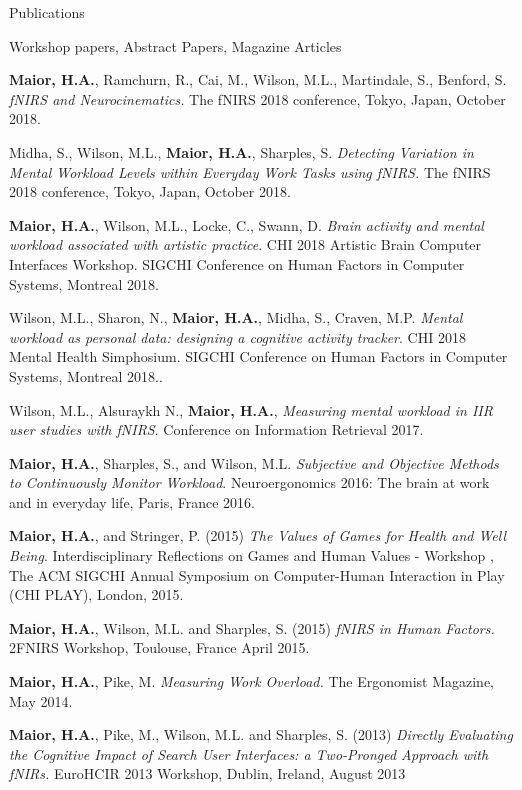 \documentclass{resume} %
\begin{document}
\begin{rSection}{Publications}
\begin{rSubsection}{ }{ }{ }{Workshop papers, Abstract Papers, Magazine Articles}
	\item \textbf{Maior, H.A.}, Ramchurn, R., Cai, M., Wilson, M.L., Martindale, S., Benford, S.  \emph{fNIRS and Neurocinematics.}  The fNIRS 2018 conference, Tokyo, Japan, October 2018.
	\item Midha, S., Wilson, M.L., \textbf{Maior, H.A.}, Sharples, S. \emph{Detecting Variation in Mental Workload Levels within Everyday Work Tasks using fNIRS.}  The fNIRS 2018 conference, Tokyo, Japan, October 2018.
	\item \textbf{Maior, H.A.}, Wilson, M.L., Locke, C., Swann, D.  \emph{Brain activity and mental workload associated with artistic practice}. CHI 2018 Artistic Brain Computer Interfaces Workshop. SIGCHI Conference on Human Factors in Computer Systems, Montreal 2018.
	\item Wilson, M.L., Sharon, N., \textbf{Maior, H.A.}, Midha, S., Craven, M.P.  \emph{Mental workload as personal data: designing a cognitive activity tracker}. CHI 2018 Mental Health Simphosium. SIGCHI Conference on Human Factors in Computer Systems, Montreal 2018..
	\item Wilson, M.L., Alsuraykh N., \textbf{Maior, H.A.},  \emph{Measuring mental workload in IIR user studies with fNIRS}. Conference on Information Retrieval 2017.
	\item \textbf{Maior, H.A.}, Sharples, S., and Wilson, M.L. \emph{Subjective and Objective Methods to Continuously Monitor Workload}. Neuroergonomics 2016: The brain at work and in everyday life, Paris, France 2016.
    \item \textbf{Maior, H.A.}, and Stringer, P. (2015) \emph{The Values of Games for Health and Well Being}. Interdisciplinary Reflections on Games and Human Values - Workshop , The ACM SIGCHI Annual Symposium on Computer-Human Interaction in Play (CHI PLAY), London, 2015.
    \item \textbf{Maior, H.A.}, Wilson, M.L. and Sharples, S. (2015) \emph{fNIRS in Human Factors.} 2FNIRS Workshop, Toulouse, France April 2015.
    \item \textbf{Maior, H.A.}, Pike, M. \emph{Measuring Work Overload.} The Ergonomist Magazine, May 2014.
    \item \textbf{Maior, H.A.}, Pike, M., Wilson, M.L. and Sharples, S. (2013) \emph{Directly Evaluating the Cognitive Impact of Search User Interfaces: a Two-Pronged Approach with fNIRs.} EuroHCIR 2013 Workshop, Dublin, Ireland, August 2013
\end{rSubsection}

\end{rSection}
\vspace{-2 mm}
\end{document}
